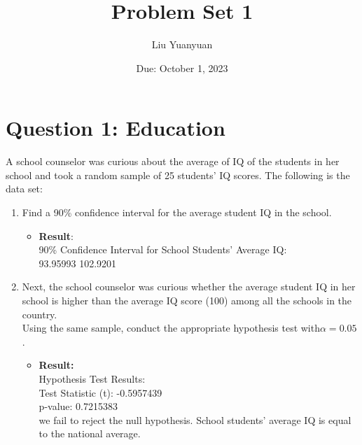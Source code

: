 \documentclass[12pt,letterpaper]{article}
\title{Problem Set 1}
\date{Due: October 1, 2023}
\author{Liu Yuanyuan}
\begin{document}
	\maketitle
	
	\vspace{1cm}
	\section*{Question 1: Education}

A school counselor was curious about the average of IQ of the students in her school and took a random sample of 25 students' IQ scores. The following is the data set:\\
\vspace{.5cm}


\begin{enumerate}
	\item Find a 90\% confidence interval for the average student IQ in the school.\\
	  
	  \begin{itemize}
		\item \textbf{Result}:\\
		 90\% Confidence Interval for School Students' Average IQ:\\
		   93.95993  102.9201  \\
		
       \end{itemize}
	\item Next, the school counselor was curious  whether  the average student IQ in her school is higher than the average IQ score (100) among all the schools in the country.\\ 
	\noindent Using the same sample, conduct the appropriate hypothesis test with$\alpha=0.05$.
		 
		\begin{itemize}
	      \item \textbf{Result:}\\
		  Hypothesis Test Results:\\
		  Test Statistic (t): -0.5957439\\ 
		  p-value: 0.7215383 \\
		  we fail to reject the null hypothesis. School students' average IQ is equal to the national average.
	\end{itemize}
\end{enumerate}
\end{document}
